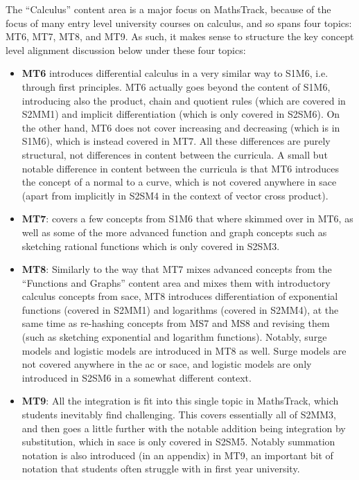 \documentclass[twoside,12pt,a4paper]{report}
\begin{document}
The ``Calculus'' content area is a major focus on MathsTrack, because of the focus of many entry level university courses on calculus, and so spans four topics: MT6, MT7, MT8, and MT9. As such, it makes sense to structure the key concept level alignment discussion below under these four topics: 
\begin{itemize}
	\item \textbf{MT6} introduces differential calculus in a very similar way to S1M6, i.e. through first principles. MT6 actually goes beyond the content of S1M6, introducing also the product, chain and quotient rules (which are covered in S2MM1) and implicit differentiation (which is only covered in S2SM6). On the other hand, MT6 does not cover increasing and decreasing (which is in S1M6), which is instead covered in MT7. All these differences are purely structural, not differences in content between the curricula. A small but notable difference in content between the curricula is that MT6 introduces the concept of a normal to a curve, which is not covered anywhere in \gls{sace} (apart from implicitly in S2SM4 in the context of vector cross product).
	\item \textbf{MT7}: covers a few concepts from S1M6 that where skimmed over in MT6, as well as some of the more advanced function and graph concepts such as sketching rational functions which is only covered in S2SM3.
	\item \textbf{MT8}: Similarly to the way that MT7 mixes advanced concepts from the ``Functions and Graphs'' content area and mixes them with introductory calculus concepts from \gls{sace}, MT8 introduces differentiation of exponential functions (covered in S2MM1) and logarithms (covered in S2MM4), at the same time as re-hashing concepts from MS7 and MS8 and revising them (such as sketching exponential and logarithm functions).  Notably, surge models and logistic models are introduced in MT8 as well. Surge models are not covered anywhere in the \gls{ac} or \gls{sace}, and logistic models are only introduced in S2SM6 in a somewhat different context.
	\item \textbf{MT9}: All the integration is fit into this single topic in MathsTrack, which students inevitably find challenging. This covers essentially all of S2MM3, and then goes a little further with the notable addition being integration by substitution, which in \gls{sace} is only covered in S2SM5. Notably summation notation is also introduced (in an appendix) in MT9, an important bit of notation that students often struggle with in first year university.
\end{itemize}
\end{document}
